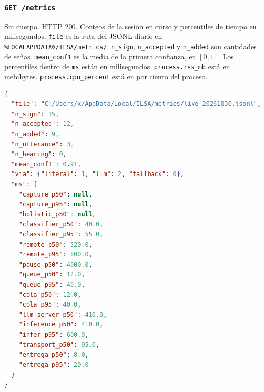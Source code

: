 \subsubsection{\texttt{GET /metrics}}

Sin cuerpo. HTTP 200. Conteos de la sesión en curso y percentiles de tiempo en milisegundos. \texttt{file} es la ruta del JSONL diario en \texttt{\%LOCALAPPDATA\%/ILSA/metrics/}. \texttt{n\_sign}, \texttt{n\_accepted} y \texttt{n\_added} son cantidades de señas. \texttt{mean\_conf1} es la media de la primera confianza, en $[0, 1]$. Los percentiles dentro de \texttt{ms} están en milisegundos. \texttt{process.rss\_mb} está en mebibytes. \texttt{process.cpu\_percent} está en por ciento del proceso.

\begin{lstlisting}[language=json]
{
  "file": "C:/Users/x/AppData/Local/ILSA/metrics/live-20261030.jsonl",
  "n_sign": 15,
  "n_accepted": 12,
  "n_added": 9,
  "n_utterance": 3,
  "n_hearing": 0,
  "mean_conf1": 0.91,
  "via": {"literal": 1, "llm": 2, "fallback": 0},
  "ms": {
    "capture_p50": null,
    "capture_p95": null,
    "holistic_p50": null,
    "classifier_p50": 40.0,
    "classifier_p95": 55.0,
    "remote_p50": 520.0,
    "remote_p95": 800.0,
    "pause_p50": 4000.0,
    "queue_p50": 12.0,
    "queue_p95": 40.0,
    "cola_p50": 12.0,
    "cola_p95": 40.0,
    "llm_server_p50": 410.0,
    "inference_p50": 410.0,
    "infer_p95": 600.0,
    "transport_p50": 95.0,
    "entrega_p50": 8.0,
    "entrega_p95": 20.0
  }
}
\end{lstlisting}

